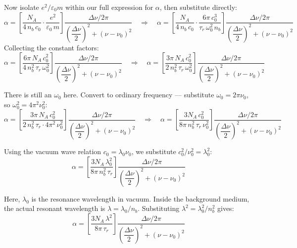 Now isolate $e^2/\varepsilon_0 m$ within our full expression for $\alpha$, then substitute directly:
\begin{equation*}
    \alpha = \left[ \frac{N_A}{4\,n_b\,c_0}\cdot\frac{e^2}{\varepsilon_0\,m} \right] \frac{\Delta\nu/2\pi}{\left(\dfrac{\Delta\nu}{2}\right)^2 + (\nu - \nu_0)^2} \quad \Rightarrow \quad \alpha = \left[ \frac{N_A}{4\,n_b\,c_0}\cdot\frac{6\pi\,c_0^3}{\tau_r\,\omega_0^2\,n_b} \right] \frac{\Delta\nu/2\pi}{\left(\dfrac{\Delta\nu}{2}\right)^2 + (\nu - \nu_0)^2}
\end{equation*}
Collecting the constant factors:
\begin{equation*}
    \alpha = \left[ \frac{6\pi\,N_A\,c_0^2}{4\,n_b^2\,\tau_r\,\omega_0^2} \right] \frac{\Delta\nu/2\pi}{\left(\dfrac{\Delta\nu}{2}\right)^2 + (\nu - \nu_0)^2} \quad \Rightarrow \quad \alpha = \left[ \frac{3\pi\,N_A\,c_0^2}{2\,n_b^2\,\tau_r\,\omega_0^2} \right] \frac{\Delta\nu/2\pi}{\left(\dfrac{\Delta\nu}{2}\right)^2 + (\nu - \nu_0)^2}
\end{equation*}

There is still an $\omega_0$ here. Convert to ordinary frequency — substitute $\omega_0 = 2\pi\nu_0$, so $\omega_0^2 = 4\pi^2\nu_0^2$:
\begin{equation*}
    \alpha = \left[ \frac{3\pi\,N_A\,c_0^2}{2\,n_b^2\,\tau_r\cdot 4\pi^2\,\nu_0^2} \right] \frac{\Delta\nu/2\pi}{\left(\dfrac{\Delta\nu}{2}\right)^2 + (\nu - \nu_0)^2} \quad \Rightarrow \quad \alpha = \left[ \frac{3N_A\,c_0^2}{8\pi\,n_b^2\,\tau_r\,\nu_0^2} \right] \frac{\Delta\nu/2\pi}{\left(\dfrac{\Delta\nu}{2}\right)^2 + (\nu - \nu_0)^2}
\end{equation*}

Using the vacuum wave relation $c_0 = \lambda_0\nu_0$, we substitute $c_0^2/\nu_0^2 = \lambda_0^2$:
\begin{equation*}
    \alpha = \left[ \frac{3N_A\,\lambda_0^2}{8\pi\,n_b^2\,\tau_r} \right] \frac{\Delta\nu/2\pi}{\left(\dfrac{\Delta\nu}{2}\right)^2 + (\nu - \nu_0)^2}
\end{equation*}

Here, $\lambda_0$ is the resonance wavelength in vacuum. Inside the background medium, the actual resonant wavelength is $\lambda = \lambda_0/n_b$. Substituting $\lambda^2 = \lambda_0^2/n_b^2$ gives:
\begin{equation*}
    \alpha = \left[ \frac{3N_A\,\lambda^2}{8\pi\,\tau_r} \right] \frac{\Delta\nu/2\pi}{\left(\dfrac{\Delta\nu}{2}\right)^2 + (\nu - \nu_0)^2}
\end{equation*}


